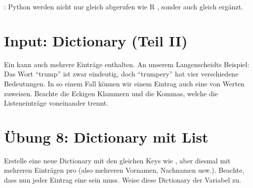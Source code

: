 \documentclass[letterpaper,10pt,english]{sphinxmanual}
\begin{document}
: Python  werden nicht nur gleich abgerufen wie R , sonder auch gleich ergänzt.

\begin{sphinxVerbatim}[commandchars=\\\{\}]
\PYG{p}{[}\PYG{p}{]}  
\end{sphinxVerbatim}


\section{Input: Dictionary (Teil II)}
\label{\detokenize{01_02_Python_Basics:input-dictionary-teil-ii}}
Ein  kann auch mehrere Einträge enthalten. An unserem Langenscheidts Beispiel: Das Wort “trump” ist zwar eindeutig, doch “trumpery” hat vier verschiedene Bedeutungen. In so einem Fall können wir einem Eintrag auch eine  von Werten zuweisen. Beachte die Eckigen Klammern und die Kommas, welche die Listeneinträge voneinander trennt.

\begin{sphinxVerbatim}[commandchars=\\\{\}]
\PYG{p}{[}\PYG{p}{]}  \PYG{p}{[}   \PYG{p}{]}    
\PYG{p}{[}\PYG{p}{]}
\end{sphinxVerbatim}

\begin{sphinxVerbatim}
\end{sphinxVerbatim}


\section{Übung 8: Dictionary mit List}
\label{\detokenize{01_02_Python_Basics:ubung-8-dictionary-mit-list}}
Erstelle eine neue Dictionary mit den gleichen Keys wie , aber diesmal mit mehreren Einträgen pro  (also mehreren Vornamen, Nachnamen usw.). Beachte, dass nun jeder Eintrag eine  sein muss. Weise diese Dictionary der Variabel  zu.
\end{document}
